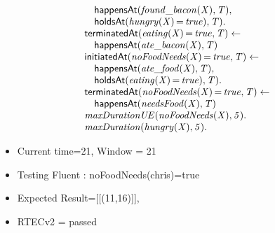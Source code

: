 \documentclass[8pt]{beamer}
\DeclareMathOperator{\val}{=}  %
\def \patsize {}
\def\happensAt{\textsf{\patsize happensAt}}
\def\holdsAt{\textsf{\patsize holdsAt}}
\def\initiatedAt{\textsf{\patsize initiatedAt}}
\def\terminatedAt{\textsf{\patsize terminatedAt}}
\newenvironment{mysplit}%
  {\arraycolsep 0pt \begin{array}{l}}%
  {\end{array}}
\begin{document}
\begin{frame}
\begin{minipage}{0.55\linewidth}
\begin{align*}
\begin{mysplit}
                \quad    \happensAt\mathit{(found\_bacon(X),T),}\\
                \quad    \holdsAt\mathit{(hungry(X)\val true),T).}\\
                \terminatedAt\mathit{(eating(X)\val true,T)\leftarrow}\\
                \quad    \happensAt\mathit{(ate\_bacon(X),T)}\\
                \initiatedAt\mathit{(noFoodNeeds(X)\val true,T)\leftarrow}\\
                \quad    \happensAt\mathit{(ate\_food(X),T),}\\
                \quad    \holdsAt\mathit{(eating(X)\val true),T).}\\
                \terminatedAt\mathit{(noFoodNeeds(X)\val true,T)\leftarrow}\\
                \quad    \happensAt\mathit{(needsFood(X),T)}\\
                \mathit{maxDurationUE(noFoodNeeds(X),5).}\\
                \mathit{maxDuration(hungry(X),5).}\\
            \end{mysplit}
        \end{align*}
    \end{minipage}
    \begin{itemize}
        \item Current time=21, Window = 21
        \item Testing Fluent :  noFoodNeeds(chris)=true
        \item Expected Result=[[(11,16)]],
        \item RTECv2 = passed
    \end{itemize}
\end{frame}
\end{document}
